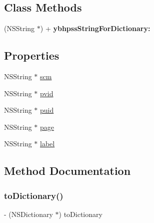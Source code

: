 \subsection*{Class Methods}
\begin{DoxyCompactItemize}
\item 
\mbox{\label{interface_alibc_track_params_af813813f6d70d5e9b0fcd2d169fd5868}} 
(N\+S\+String $\ast$) + {\bfseries ybhpss\+String\+For\+Dictionary\+:}
\end{DoxyCompactItemize}
\subsection*{Properties}
\begin{DoxyCompactItemize}
\item 
N\+S\+String $\ast$ \mbox{\hyperlink{interface_alibc_track_params_a705d775b617380e6ad56549633ad1153}{scm}}
\item 
N\+S\+String $\ast$ \mbox{\hyperlink{interface_alibc_track_params_a2036d58c1619aab0c79a260405004cfb}{pvid}}
\item 
N\+S\+String $\ast$ \mbox{\hyperlink{interface_alibc_track_params_a3bcf8ad9dcc4aeac6044815236cd4b48}{puid}}
\item 
N\+S\+String $\ast$ \mbox{\hyperlink{interface_alibc_track_params_abe369e21fc4814b437141c8ab62c24bb}{page}}
\item 
N\+S\+String $\ast$ \mbox{\hyperlink{interface_alibc_track_params_ac26f6b2639172ca6654407604bc25e11}{label}}
\end{DoxyCompactItemize}


\subsection{Method Documentation}
\mbox{\label{interface_alibc_track_params_ad9b3d9ebe3f600c74a12d477f97170de}} 
\subsubsection{\texorpdfstring{to\+Dictionary()}{toDictionary()}}
{\footnotesize\ttfamily -\/ (N\+S\+Dictionary $\ast$) to\+Dictionary \begin{DoxyParamCaption}{ }\end{DoxyParamCaption}}

